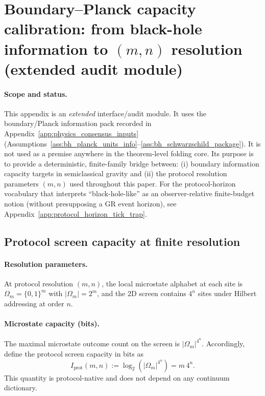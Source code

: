 \section[Boundary--Planck capacity calibration]{Boundary--Planck capacity calibration: from black-hole information to \texorpdfstring{$(m,n)$}{(m,n)} resolution (extended audit module)}
\label{app:bh_planck_capacity_calibration}

\paragraph{Scope and status.}
\AuditTag This appendix is an \emph{extended} interface/audit module.
It uses the boundary/Planck information pack recorded in Appendix~\ref{app:physics_consensus_inputs}
(Assumptions~\ref{ass:bh_planck_units_info}--\ref{ass:bh_schwarzschild_package}).
It is not used as a premise anywhere in the theorem-level folding core.
Its purpose is to provide a deterministic, finite-family bridge between:
(i) boundary information capacity targets in semiclassical gravity and
(ii) the protocol resolution parameters $(m,n)$ used throughout this paper.
\AuditTag For the protocol-horizon vocabulary that interprets ``black-hole-like'' as an observer-relative finite-budget notion (without presupposing a GR event horizon), see Appendix~\ref{app:protocol_horizon_tick_trap}.

\subsection{Protocol screen capacity at finite resolution}
\label{subsec:bh_capacity_protocol}

\paragraph{Resolution parameters.}
\InterfaceTag At protocol resolution $(m,n)$, the local microstate alphabet at each site is $\Omega_m=\{0,1\}^m$ with $|\Omega_m|=2^m$,
and the $2$D screen contains $4^n$ sites under Hilbert addressing at order $n$.

\paragraph{Microstate capacity (bits).}
\InterfaceTag The maximal microstate outcome count on the screen is $|\Omega_m|^{4^n}$.
Accordingly, define the protocol screen capacity in bits as
\begin{equation}
\label{eq:bh_capacity_I_prot_def}
I_{\mathrm{prot}}(m,n)
:=
\log_2\!\left(|\Omega_m|^{4^n}\right)
=
m\,4^n.
\end{equation}
This quantity is protocol-native and does not depend on any continuum dictionary.

